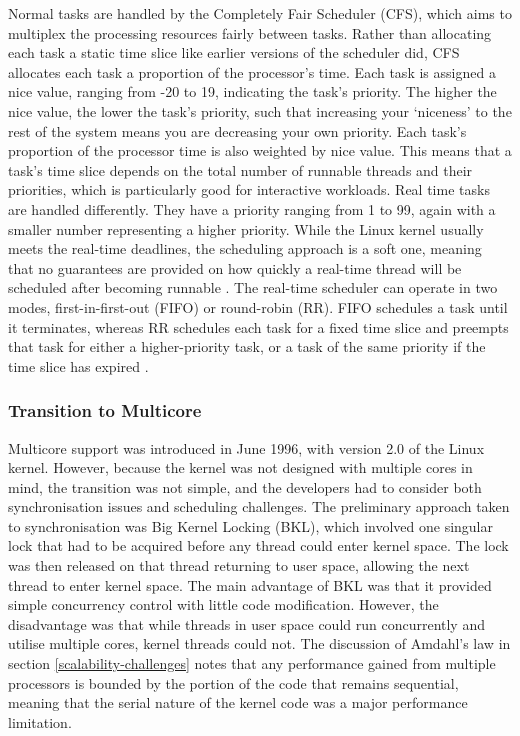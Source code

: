 \documentclass[bsc,frontabs,singlespacing,parskip,deptreport]{infthesis}
\begin{document}
Normal tasks are handled by the Completely Fair Scheduler (CFS), which aims to multiplex the processing resources fairly between tasks. Rather than allocating each task a static time slice like earlier versions of the scheduler did, CFS allocates each task a proportion of the processor's time. Each task is assigned a nice value, ranging from -20 to 19, indicating the task's priority. The higher the nice value, the lower the task's priority, such that increasing your `niceness' to the rest of the system means you are decreasing your own priority. Each task's proportion of the processor time is also weighted by nice value. This means that a task's time slice depends on the total number of runnable threads and their priorities, which is particularly good for interactive workloads. Real time tasks are handled differently. They have a priority ranging from 1 to 99, again with a smaller number representing a higher priority. While the Linux kernel usually meets the real-time deadlines, the scheduling approach is a soft one, meaning that no guarantees are provided on how quickly a real-time thread will be scheduled after becoming runnable \cite{silberschatz}. The real-time scheduler can operate in two modes, first-in-first-out (FIFO) or round-robin (RR). FIFO schedules a task until it terminates, whereas RR schedules each task for a fixed time slice and preempts that task for either a higher-priority task, or a task of the same priority if the time slice has expired \cite{seeker}.

\subsubsection{Transition to Multicore} \label{transition-to-multicore}
Multicore support was introduced in June 1996, with version 2.0 of the Linux kernel. However, because the kernel was not designed with multiple cores in mind, the transition was not simple, and the developers had to consider both synchronisation issues and scheduling challenges. The preliminary approach taken to synchronisation was Big Kernel Locking (BKL), which involved one singular lock that had to be acquired before any thread could enter kernel space. The lock was then released on that thread returning to user space, allowing the next thread to enter kernel space. The main advantage of BKL was that it provided simple concurrency control with little code modification. However, the disadvantage was that while threads in user space could run concurrently and utilise multiple cores, kernel threads could not. The discussion of Amdahl's law in section \ref{scalability-challenges} notes that any performance gained from multiple processors is bounded by the portion of the code that remains sequential, meaning that the serial nature of the kernel code was a major performance limitation.
\end{document}
